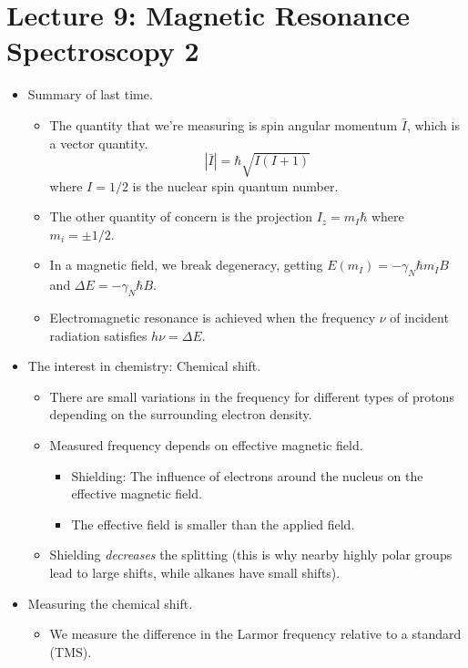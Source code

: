 \documentclass[../notes.tex]{subfiles}
\begin{document}
\section{Lecture 9: Magnetic Resonance Spectroscopy 2}
\begin{itemize}
    \item {}Summary of last time.
    \begin{itemize}
        \item The quantity that we're measuring is spin angular momentum $\bar{I}$, which is a vector quantity.
        \begin{equation*}
            |\bar{I}| = \hbar\sqrt{I(I+1)}
        \end{equation*}
        where $I=1/2$ is the nuclear spin quantum number.
        \item The other quantity of concern is the projection $I_z=m_I\hbar$ where $m_i=\pm 1/2$.
        \item In a magnetic field, we break degeneracy, getting $E(m_I)=-\gamma_N\hbar m_IB$ and $\Delta E=-\gamma_N\hbar B$.
        \item Electromagnetic resonance is achieved when the frequency $\nu$ of incident radiation satisfies $h\nu=\Delta E$.
    \end{itemize}
    \item The interest in chemistry: Chemical shift.
    \begin{itemize}
        \item There are small variations in the frequency for different types of protons depending on the surrounding electron density.
        \item Measured frequency depends on effective magnetic field.
        \begin{itemize}
            \item Shielding: The influence of electrons around the nucleus on the effective magnetic field.
            \item The effective field is smaller than the applied field.
        \end{itemize}
        \item Shielding \emph{decreases} the splitting (this is why nearby highly polar groups lead to large shifts, while alkanes have small shifts).
    \end{itemize}
    \item Measuring the chemical shift.
    \begin{itemize}
        \item We measure the difference in the Larmor frequency relative to a standard (TMS).

\end{itemize}
\end{itemize}
\end{document}
